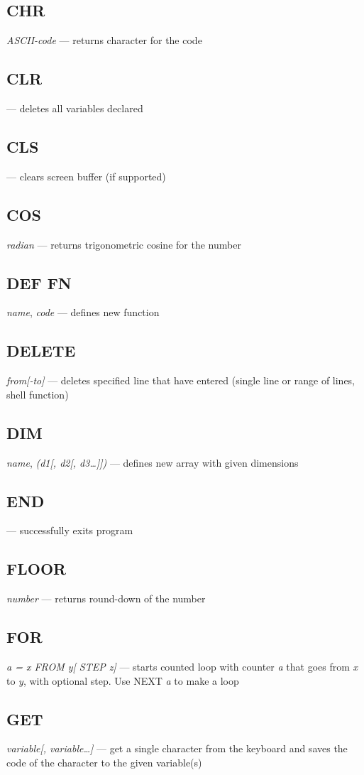 \subsection{CHR} \emph{ASCII-code} --- returns character for the code
\subsection{CLR} --- deletes all variables declared
\subsection{CLS} --- clears screen buffer (if supported)
\subsection{COS} \emph{radian} --- returns trigonometric cosine for the number
\subsection{DEF FN} \emph{name}, \emph{code} --- defines new function
\subsection{DELETE} \emph{from[-to]} --- deletes specified line that have entered (single line or range of lines, shell function)
\subsection{DIM} \emph{name}, \emph{(d1[, d2[, d3\ldots]])} --- defines new array with given dimensions
\subsection{END} --- successfully exits program
\subsection{FLOOR} \emph{number} --- returns round-down of the number
\subsection{FOR} \emph{a = x FROM y[ STEP z]} --- starts counted loop with counter \emph{a} that goes from \emph{x} to \emph{y}, with optional step. Use NEXT \emph{a} to make a loop
\subsection{GET} \emph{variable[, variable\ldots]} --- get a single character from the keyboard and saves the code of the character to the given variable(s)
